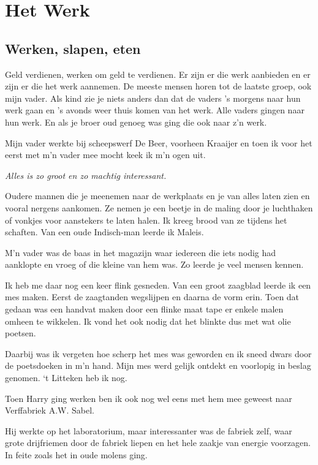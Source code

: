 \documentclass[10pt,twoside,openright]{memoir}
\begin{document}
\part{Het Werk}

\chapter{Werken, slapen, eten} %
\label{cha:werkenslapen}

Geld verdienen, werken om geld te verdienen. Er zijn er die werk aanbieden en er zijn er die het werk aannemen. De meeste mensen horen tot de laatste groep, ook mijn vader. Als kind zie je niets anders dan dat de vaders ’s morgens naar hun werk gaan en ’s avonds weer thuis komen van het werk. Alle vaders gingen naar hun werk. En als je broer oud genoeg was ging die ook naar z’n werk.

Mijn vader werkte bij scheepswerf De Beer, voorheen Kraaijer en toen ik voor het eerst met m’n vader mee mocht keek ik m’n ogen uit.

\emph{Alles is zo groot en zo machtig interessant. }

Oudere mannen die je meenemen naar de werkplaats en je van alles laten zien en vooral nergens aankomen. Ze nemen je een beetje in de maling door je luchthaken of vonkjes voor aanstekers te laten halen. Ik kreeg brood van ze tijdens het schaften. Van een oude Indisch-man leerde ik Maleis. 

M’n vader was de baas in het magazijn waar iedereen die iets nodig had aanklopte en vroeg of die kleine van hem was. Zo leerde je veel mensen kennen. 

Ik heb me daar nog een keer flink gesneden. Van een groot zaagblad leerde ik een mes maken. Eerst de zaagtanden wegslijpen en daarna de vorm erin. Toen dat gedaan was een handvat maken door een flinke maat tape er enkele malen omheen te wikkelen. Ik vond het ook nodig dat het blinkte dus met wat olie poetsen. 

Daarbij was ik vergeten hoe scherp het mes was geworden en ik sneed dwars door de poetsdoeken in m’n hand. Mijn mes werd gelijk ontdekt en voorlopig in beslag genomen. ‘t Litteken heb ik nog.

Toen Harry ging werken ben ik ook nog wel eens met hem mee geweest naar Verffabriek A.W. Sabel. 

Hij werkte op het laboratorium, maar interessanter was de fabriek zelf, waar grote drijfriemen door de fabriek liepen en het hele zaakje van energie voorzagen. In feite zoals het in oude molens ging.
\end{document}
